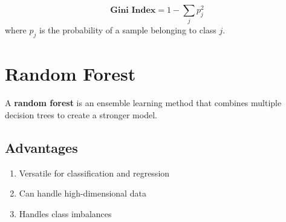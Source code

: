 \documentclass{article}
\begin{document}
\[\textbf{Gini Index}=1-\sum_j p_j^2\] where $p_j$ is the probability of a sample belonging to class $j$.

\section*{Random Forest}

A \textbf{random forest} is an ensemble learning method that combines multiple decision trees to create a stronger model.

\subsection*{Advantages}

\begin{enumerate}
    \item Versatile for classification and regression
    \item Can handle high-dimensional data
    \item Handles class imbalances
\end{enumerate}
\end{document}
